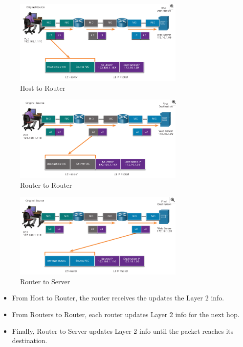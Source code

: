 \documentclass[a4paper,11pt]{article}
\begin{document}
\begin{figure}[h!]
    \centering
    \includegraphics[width=0.75\textwidth]{10.png}
    \caption{Host to Router}
    \label{fig:cap1}
\end{figure}

\begin{figure}[h!]
    \centering
    \includegraphics[width=0.75\textwidth]{11.png}
    \caption{Router to Router}
    \label{fig:cap1}
\end{figure}

\begin{figure}[h!]
    \centering
    \includegraphics[width=0.75\textwidth]{12.png}
    \caption{Router to Server}
    \label{fig:cap1}
\end{figure}
\newpage
\begin{itemize}
    \item  From Host to Router, the router receives the updates the Layer 2 info.\\
    \item From Routers to Router, each router updates Layer 2 info for the next hop.\\
    \item Finally, Router to Server updates Layer 2 info until the packet reaches its destination.\\
\end{itemize}
\end{document}
